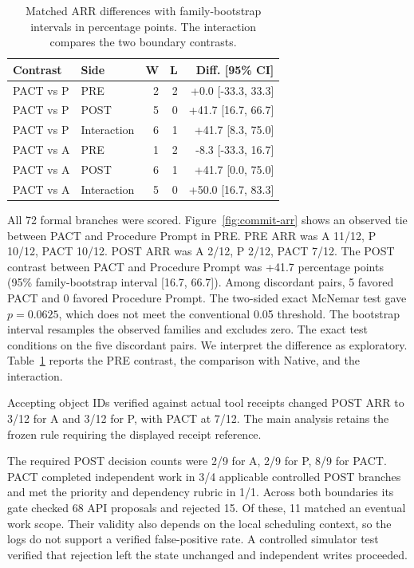 \begin{table}[t]
\centering
\caption{Matched ARR differences with family-bootstrap intervals in percentage points. The interaction compares the two boundary contrasts.}
\label{tab:pactpair}
\small\setlength{\tabcolsep}{3pt}
\begin{tabular}{llrrr}
\toprule
Contrast & Side & W & L & Diff. [95\% CI] \\
\midrule
PACT vs P & PRE & 2 & 2 & +0.0 [-33.3, 33.3] \\
PACT vs P & POST & 5 & 0 & +41.7 [16.7, 66.7] \\
PACT vs P & Interaction & 6 & 1 & +41.7 [8.3, 75.0] \\
PACT vs A & PRE & 1 & 2 & -8.3 [-33.3, 16.7] \\
PACT vs A & POST & 6 & 1 & +41.7 [0.0, 75.0] \\
PACT vs A & Interaction & 5 & 0 & +50.0 [16.7, 83.3] \\
\bottomrule
\end{tabular}
\end{table}

All 72 formal branches were scored. Figure~\ref{fig:commit-arr} shows an observed tie between PACT and Procedure Prompt in PRE. PRE ARR was A 11/12, P 10/12, PACT 10/12. POST ARR was A 2/12, P 2/12, PACT 7/12. The POST contrast between PACT and Procedure Prompt was +41.7 percentage points (95\% family-bootstrap interval [16.7, 66.7]). Among discordant pairs, 5 favored PACT and 0 favored Procedure Prompt. The two-sided exact McNemar test gave $p=0.0625$, which does not meet the conventional 0.05 threshold. The bootstrap interval resamples the observed families and excludes zero. The exact test conditions on the five discordant pairs. We interpret the difference as exploratory. Table~\ref{tab:pactpair} reports the PRE contrast, the comparison with Native, and the interaction.

Accepting object IDs verified against actual tool receipts changed POST ARR to 3/12 for A and 3/12 for P, with PACT at 7/12. The main analysis retains the frozen rule requiring the displayed receipt reference.

The required POST decision counts were 2/9 for A, 2/9 for P, 8/9 for PACT. PACT completed independent work in 3/4 applicable controlled POST branches and met the priority and dependency rubric in 1/1. Across both boundaries its gate checked 68 API proposals and rejected 15. Of these, 11 matched an eventual work scope. Their validity also depends on the local scheduling context, so the logs do not support a verified false-positive rate. A controlled simulator test verified that rejection left the state unchanged and independent writes proceeded.

